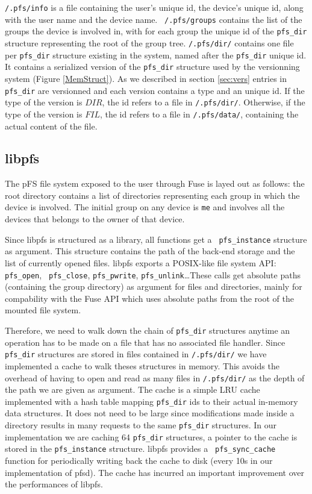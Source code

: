 {\tt /.pfs/info} is a file containing the user's unique id, the device's
unique id, along with the user name and the device name. {\tt
  /.pfs/groups} contains the list of the groups the device is involved
in, with for each group the unique id of the {\tt pfs\_dir} structure
representing the root of the group tree. {\tt /.pfs/dir/} contains one
file per {\tt pfs\_dir} structure existing in the system, named after
the {\tt pfs\_dir} unique id. It contains a serialized version of the
{\tt pfs\_dir} structure used by the versionning system (Figure
\ref{MemStruct}). As we described in section \ref{sec:vers}
entries in {\tt pfs\_dir} are versionned and each version contains a
type and an unique id. If the type of the version is $DIR$, the id
refers to a file in {\tt /.pfs/dir/}. Otherwise, if the type of the
version is $FIL$, the id refers to a file in {\tt /.pfs/data/},
containing the actual content of the file.

\subsection {libpfs}

The pFS file system exposed to the user through Fuse is layed out as
follows: the root directory contains a list of directories
representing each group in which the device is involved. The initial
group on any device is {\tt me} and involves all the devices that
belongs to the owner of that device.

Since libpfs is structured as a library, all functions get a {\tt
  pfs\_instance} structure as argument. This structure contains the path
of the back-end storage and the list of currently opened files. libpfs
exports a POSIX-like file system API: {\tt pfs\_open}, {\tt
  pfs\_close}, {\tt pfs\_pwrite}, {\tt pfs\_unlink}\ldots These calls get
absolute paths (containing the group directory) as argument for files
and directories, mainly for compability with the Fuse API
which uses absolute paths from the root of the mounted file system.

Therefore, we need to walk down the chain of {\tt pfs\_dir} structures
anytime an operation has to be made on a file that has no associated
file handler. Since {\tt pfs\_dir} structures are stored in files
contained in {\tt /.pfs/dir/} we have implemented a cache to walk
theses structures in memory. This avoids the overhead of having to
open and read as many files in {\tt /.pfs/dir/} as the depth of the
path we are given as argument. The cache is a simple LRU cache
implemented with a hash table mapping {\tt pfs\_dir} ids to their
actual in-memory data structures. It does not need to be large since
modifications made inside a directory results in many requests to the
same {\tt pfs\_dir} structures. In our implementation we are caching
64 {\tt pfs\_dir} structures, a pointer to the cache is stored in the
{\tt pfs\_instance} structure. libpfs provides a {\tt
  pfs\_sync\_cache} function for periodically writing back the cache
to disk (every 10s in our implementation of pfsd). The cache has
incurred an important improvement over the performances of libpfs.


